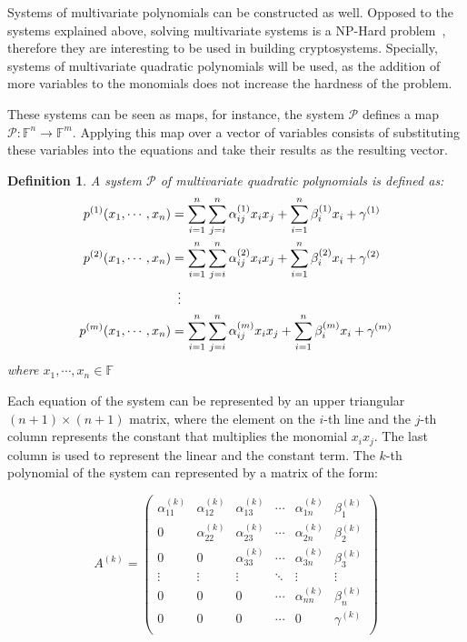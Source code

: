 \documentclass{ufsctex/ufsctex}
\newtheorem{definition}{Definition}
\begin{document}
Systems of multivariate polynomials can be constructed as well. Opposed to the
systems explained above, solving multivariate systems is a NP-Hard
problem~\cite{garey1990npc}, therefore they are interesting to be used in
building cryptosystems. Specially, systems of multivariate quadratic
polynomials will be used, as the addition of more variables to the monomials
does not increase the hardness of the problem. %

These systems can be seen as maps, for instance, the system $\mathcal{P}$
defines a map $\mathcal{P}:\mathbb{F}^n \to \mathbb{F}^m$. Applying this map
over a vector of variables consists of substituting these variables into the
equations and take their results as the resulting vector.

\begin{definition}\label{def:mqsystem}
A system $\mathcal{P}$ of multivariate quadratic polynomials is defined as:
\begin{equation}\label{eq:mqsystem}
\begin{split}
p^{(1)}(x_1,\cdots,x_n) &= \sum_{i=1}^n \sum_{j=i}^n \alpha^{(1)}_{ij} x_i x_j
	+ \sum_{i=1}^n \beta^{(1)}_i x_i + \gamma^{(1)} \\
p^{(2)}(x_1,\cdots,x_n) &= \sum_{i=1}^n \sum_{j=i}^n \alpha^{(2)}_{ij} x_i x_j
	+ \sum_{i=1}^n \beta^{(2)}_i x_i + \gamma^{(2)} \\
&\vdotswithin{=} \\
p^{(m)}(x_1,\cdots,x_n) &= \sum_{i=1}^n \sum_{j=i}^n \alpha^{(m)}_{ij} x_i x_j
	+ \sum_{i=1}^n \beta^{(m)}_i x_i + \gamma^{(m)}
\end{split}
\end{equation}
where $x_1,\cdots,x_n \in \mathbb{F}$
\end{definition}

Each equation of the system can be represented by an upper triangular
$(n+1)\times(n+1)$ matrix, where the element on the $i$-th line and the $j$-th
column represents the constant that multiplies the monomial $x_i x_j$. The last
column is used to represent the linear and the constant term. The $k$-th
polynomial of the system can represented by a matrix of the form:

\begin{equation}
A^{(k)} =
\begin{pmatrix}
\alpha^{(k)}_{11} & \alpha^{(k)}_{12} & \alpha^{(k)}_{13} & \cdots &
	\alpha^{(k)}_{1n} & \beta^{(k)}_1 \\
0 & \alpha^{(k)}_{22} & \alpha^{(k)}_{23} & \cdots &
	\alpha^{(k)}_{2n} & \beta^{(k)}_2 \\
0 & 0 & \alpha^{(k)}_{33} & \cdots &
	\alpha^{(k)}_{3n} & \beta^{(k)}_3 \\
\vdots & \vdots & \vdots & \ddots & \vdots & \vdots \\
0 & 0 & 0 & \cdots & \alpha^{(k)}_{nn} & \beta^{(k)}_n \\
0 & 0 & 0 & \cdots & 0 & \gamma^{(k)} \\
\end{pmatrix}
\end{equation}
\end{document}
